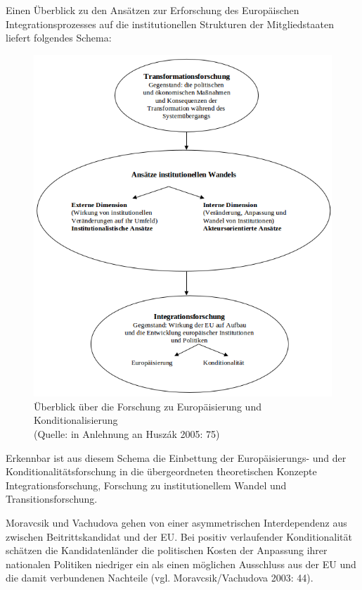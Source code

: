 Einen Überblick zu den Ansätzen zur Erforschung des Europäischen Integrationsprozesses auf die institutionellen Strukturen der Mitgliedstaaten liefert folgendes Schema:
\begin{figure}[H]
  \centering
  \includegraphics[width=5in]{Material/ForschungZuEuropUndKondi_ohneRand}
  \caption{ Überblick über die Forschung zu Europäisierung und Konditionalisierung\\(Quelle: in Anlehnung an Huszák 2005: 75) }
\end{figure}
Erkennbar ist aus diesem Schema die Einbettung der Europäisierungs- und der Konditionalitätsforschung in die übergeordneten theoretischen Konzepte Integrationsforschung, Forschung zu institutionellem Wandel und Transitionsforschung.\par
Moravcsik und Vachudova gehen von einer asymmetrischen Interdependenz aus zwischen Beitrittskandidat und der EU. Bei positiv verlaufender Konditionalität schätzen die Kandidatenländer die politischen Kosten der Anpassung ihrer nationalen Politiken niedriger ein als einen möglichen Ausschluss aus der EU und die damit verbundenen Nachteile (vgl. Moravcsik/Vachudova 2003: 44).
\par
